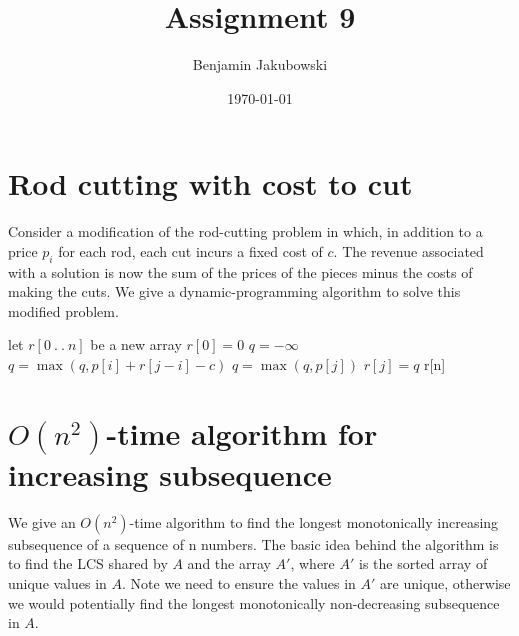 \documentclass[paper=a4, fontsize=11pt]{scrartcl} %
\title{	Assignment 9}
\author{Benjamin Jakubowski} %
\date{\normalsize\today} %
\numberwithin{equation}{section} %
\numberwithin{figure}{section} %
\numberwithin{table}{section} %
\begin{document}
\maketitle %

\section{Rod cutting with cost to cut}

Consider a modification of the rod-cutting problem in which, in addition to a price $p_i$ for each rod, each cut incurs a fixed cost of $c$. The revenue associated with a solution is now the sum of the prices of the pieces minus the costs of making the cuts. We give a dynamic-programming algorithm to solve this modified problem.

\begin{algorithmic}
\State let $r[0~.~.~n]$ be a new array
\State $r[0] = 0$ 
	\State $q = - \infty$
			\State $q = \max(q, p[i] + r[j - i] - c)$ 
		\Else {}
			\State $q = \max(q, p[j])$ 
		\EndIf
	\EndFor
	\State $r[j] = q$
\State \Return r[n]
\EndFor
\EndFunction
\end{algorithmic}

\section{$O(n^2)$-time algorithm for increasing subsequence}

We give an $O(n^2)$-time algorithm to find the longest monotonically increasing subsequence of a sequence of n numbers. The basic idea behind the algorithm is to find the LCS shared by $A$ and the array $A'$, where $A'$ is the sorted array of unique values in $A$. Note we need to ensure the values in $A'$ are unique, otherwise we would potentially find the longest monotonically non-decreasing subsequence in $A$.
\end{document}
